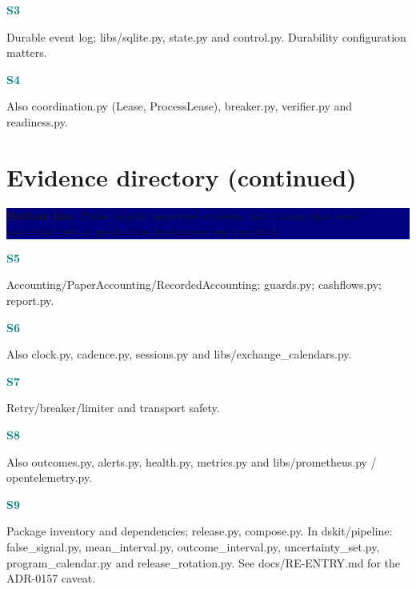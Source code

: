 \documentclass[10pt,letterpaper]{article}
\newcommand{\bl}[1]{\noindent\colorbox{navy}{\parbox{\dimexpr\linewidth-2\fboxsep}{\color{white}\textbf{Bottom line.} #1}}\par\medskip}
\newcommand{\topic}[2]{\clearpage\section{#1}\bl{#2}}
\newcommand{\sub}[1]{\par\textbf{\textcolor{teal}{#1}}\par}
\begin{document}
\sub{S3}
{\small{}}\par
Durable event log; libs/sqlite.py, state.py and control.py. Durability configuration matters.
\sub{S4}
{\small{}}\par
Also coordination.py (Lease, ProcessLease), breaker.py, verifier.py and readiness.py.
\topic{Evidence directory (continued)}{Paths identify inspected evidence, not a claim that every associated test or production deployment was executed.}
\sub{S5}
{\small{}}\par
Accounting/PaperAccounting/RecordedAccounting; guards.py; cashflows.py; report.py.
\sub{S6}
{\small{}}\par
Also clock.py, cadence.py, sessions.py and libs/exchange\_calendars.py.
\sub{S7}
{\small{}}\par
Retry/breaker/limiter and transport safety.
\sub{S8}
{\small{}}\par
Also outcomes.py, alerts.py, health.py, metrics.py and libs/prometheus.py / opentelemetry.py.
\sub{S9}
{\small{}}\par
Package inventory and dependencies; release.py, compose.py. In dskit/pipeline: false\_signal.py, mean\_interval.py, outcome\_interval.py, uncertainty\_set.py, program\_calendar.py and release\_rotation.py. See docs/RE-ENTRY.md for the ADR-0157 caveat.
\end{document}
